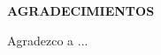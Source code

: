 \begin{agradecimientos}
\vspace{50 mm}

\begin{center}
  \normalsize\textbf{{AGRADECIMIENTOS}}
\end{center}

Agradezco a ...


\end{agradecimientos}